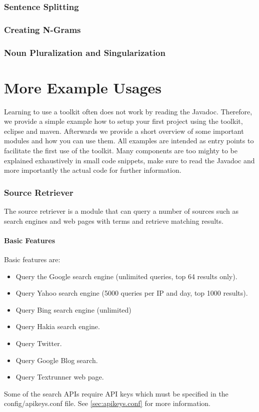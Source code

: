 \documentclass[a4paper,twoside]{book}      %
\begin{document}
\subsection{Sentence Splitting}
\subsection{Creating N-Grams}
\subsection{Noun Pluralization and Singularization}

\chapter{More Example Usages}
Learning to use a toolkit often does not work by reading the Javadoc. Therefore, we provide a simple example how to setup your first project using the toolkit, eclipse and maven. Afterwards we provide a short overview of some important modules and how you can use them. All examples are intended as entry points to facilitate the first use of the toolkit. Many components are too mighty to be explained exhaustively in small code snippets, make sure to read the Javadoc and more importantly the actual code for further information.

\subsection{Source Retriever}
The source retriever is a module that can query a number of sources such as search engines and web pages with terms and retrieve matching results.
\subsubsection{Basic Features}
Basic features are:
\begin{itemize}
\item Query the Google search engine (unlimited queries, top 64 results only).
\item Query Yahoo search engine (5000 queries per IP and day, top 1000 results).
\item Query Bing search engine (unlimited)
\item Query Hakia search engine.
\item Query Twitter.
\item Query Google Blog search.
\item Query Textrunner web page.
\end{itemize}
Some of the search APIs require API keys which must be specified in the config/apikeys.conf file. See \ref{sec:apikeys.conf} for more information.
\end{document}
